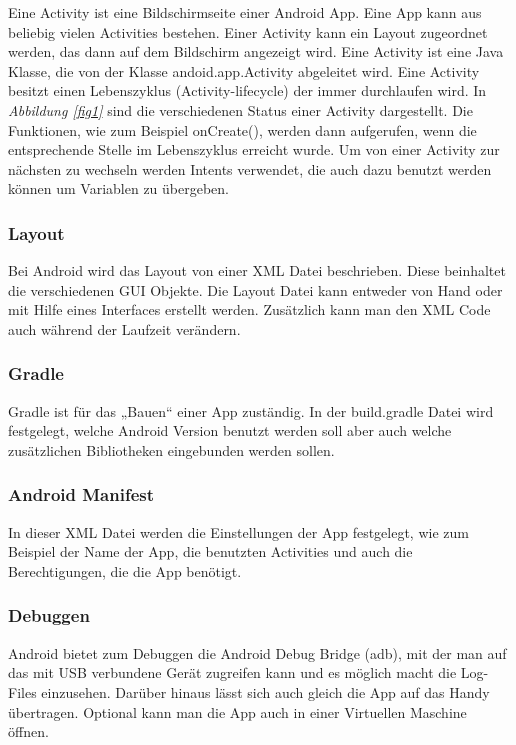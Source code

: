 \documentclass{article}
\begin{document}
{			Eine Activity ist eine Bildschirmseite einer Android App. Eine App kann aus beliebig vielen Activities bestehen. Einer Activity kann ein Layout zugeordnet werden, das dann auf dem Bildschirm angezeigt wird. Eine Activity ist eine Java Klasse, die von der Klasse andoid.app.Activity abgeleitet wird.
			Eine Activity besitzt einen Lebenszyklus (Activity-lifecycle) der immer durchlaufen wird. In \textit{Abbildung \ref{fig1}} sind die verschiedenen Status einer Activity dargestellt. Die Funktionen, wie zum Beispiel onCreate(), werden dann aufgerufen, wenn die entsprechende Stelle im Lebenszyklus erreicht wurde.
			Um von einer Activity zur nächsten zu wechseln werden Intents verwendet, die auch dazu benutzt werden können um Variablen zu übergeben.

		\subsubsection{Layout}
			Bei Android wird das Layout von einer XML Datei beschrieben. Diese beinhaltet die verschiedenen GUI Objekte. Die Layout Datei kann entweder von Hand oder mit Hilfe eines Interfaces erstellt werden. Zusätzlich kann man den XML Code auch während der Laufzeit verändern.

		\subsubsection{Gradle}
			Gradle ist für das „Bauen“ einer App zuständig. In der build.gradle Datei wird festgelegt, welche Android Version benutzt werden soll aber auch welche zusätzlichen Bibliotheken eingebunden werden sollen.

		\subsubsection{Android Manifest}
			In dieser XML Datei werden die Einstellungen der App festgelegt, wie zum Beispiel der Name der App, die benutzten Activities und auch die Berechtigungen, die die App benötigt.

		\subsubsection{Debuggen}
			Android bietet zum Debuggen die Android Debug Bridge (adb), mit der man auf das mit USB verbundene Gerät zugreifen kann und es möglich macht die Log-Files einzusehen. Darüber hinaus lässt sich auch gleich die App auf das Handy übertragen. Optional kann man die App auch in einer Virtuellen Maschine öffnen.

}
\end{document}
